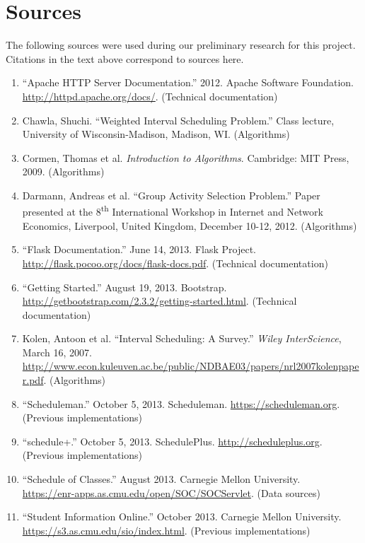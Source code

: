 \section{Sources}
The following sources were used during our preliminary research
for this project. Citations in the text above correspond to sources here.
\begin{enumerate}
\item ``Apache HTTP Server Documentation.'' 2012. Apache Software Foundation. \\ \href{http://httpd.apache.org/docs/}{http://httpd.apache.org/docs/}. (Technical documentation)
\item Chawla, Shuchi. ``Weighted Interval Scheduling Problem.'' Class lecture, University of Wisconsin-Madison, Madison, WI. (Algorithms)
\item Cormen, Thomas et al. {\em Introduction to Algorithms}. Cambridge: MIT Press, 2009. (Algorithms)
\item Darmann, Andreas et al. ``Group Activity Selection Problem.'' Paper presented at the 8\textsuperscript{th} International Workshop in Internet and Network Economics, Liverpool, United Kingdom, December 10-12, 2012. (Algorithms)
\item ``Flask Documentation.'' June 14, 2013. Flask Project. \href{http://flask.pocoo.org/docs/flask-docs.pdf}{http://flask.pocoo.org/docs/flask-docs.pdf}. (Technical documentation)
\item ``Getting Started.'' August 19, 2013. Bootstrap. \href{http://getbootstrap.com/2.3.2/getting-started.html}{http://getbootstrap.com/2.3.2/getting-started.html}. (Technical documentation)
\item Kolen, Antoon et al. ``Interval Scheduling: A Survey.'' {\em Wiley InterScience}, March 16, 2007. \href{http://www.econ.kuleuven.ac.be/public/NDBAE03/papers/nrl2007kolenpaper.pdf}{http://www.econ.kuleuven.ac.be/public/NDBAE03/papers/nrl2007kolenpaper.pdf}. (Algorithms)
\item ``Scheduleman.'' October 5, 2013. Scheduleman. \href{https://scheduleman.org}{https://scheduleman.org}. (Previous implementations)
\item ``schedule+.'' October 5, 2013. SchedulePlus. \href{http://scheduleplus.org}{http://scheduleplus.org}. (Previous implementations)
\item ``Schedule of Classes.'' August 2013. Carnegie Mellon University. \\ \href{https://enr-apps.as.cmu.edu/open/SOC/SOCServlet}{https://enr-apps.as.cmu.edu/open/SOC/SOCServlet}. (Data sources)
\item ``Student Information Online.'' October 2013. Carnegie Mellon University. \\ \href{https://s3.as.cmu.edu/sio/index.html}{https://s3.as.cmu.edu/sio/index.html}. (Previous implementations)
\end{enumerate}
